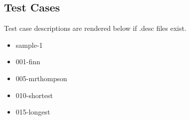 \documentclass{article}%
\begin{document}
\subsection{Test Cases}%
\label{subsec:TestCases}%
Test case descriptions are rendered below if .desc files exist.%
\begin{itemize}%
\item%
sample{-}1%
\item%
001{-}finn%
%
\item%
005{-}mrthompson%
%
\item%
010{-}shortest%
\item%
015{-}longest%
\end{itemize}

%
\end{document}
